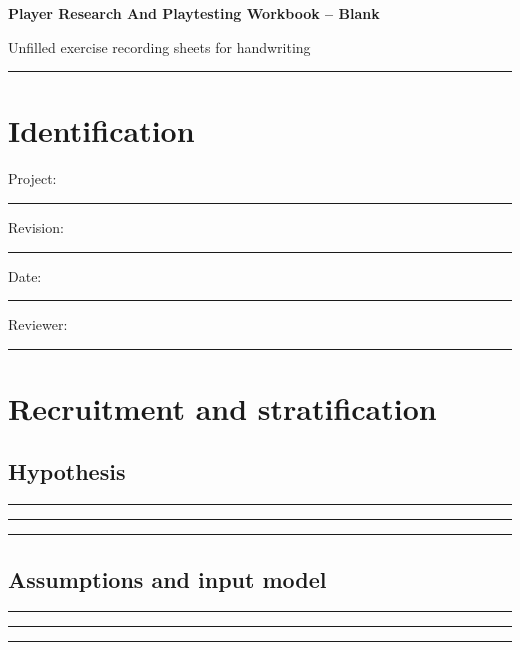 \documentclass[11pt]{article}
\begin{document}
{\huge\bfseries\color{suiteblue} Player Research And Playtesting Workbook -- Blank}\par
\vspace{0.15in}
{\normalsize\color{suitegray} Unfilled exercise recording sheets for handwriting}\par
\vspace{0.15in}\hrule\vspace{0.15in}

\section{Identification}
Project: \rule{0.70\linewidth}{0.4pt}\par\vspace{0.25in}
Revision: \rule{0.36\linewidth}{0.4pt}\hfill Date: \rule{0.26\linewidth}{0.4pt}\par\vspace{0.25in}
Reviewer: \rule{0.67\linewidth}{0.4pt}\par
\clearpage

\section{Recruitment and stratification}

\subsection{Hypothesis}
\noindent\rule{\linewidth}{0.35pt}\par\vspace{0.22in}
\noindent\rule{\linewidth}{0.35pt}\par\vspace{0.22in}
\noindent\rule{\linewidth}{0.35pt}\par\vspace{0.18in}

\subsection{Assumptions and input model}
\noindent\rule{\linewidth}{0.35pt}\par\vspace{0.22in}
\noindent\rule{\linewidth}{0.35pt}\par\vspace{0.22in}
\noindent\rule{\linewidth}{0.35pt}\par\vspace{0.18in}
\end{document}
